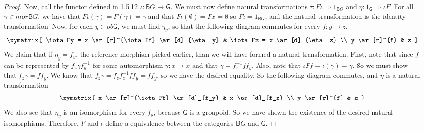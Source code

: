 \documentclass[main.tex]{subfiles}
\begin{document}
\begin{proof}
	Now, call the functor defined in 1.5.12  $\iota: \textsf{B}G \rightarrow
	\textsf{G}$. We must now define natural transformations $\tau:F\iota
	\Rightarrow 1_{\textsf{B}G} $ and $\eta: 1_{\textsf{G}}\Rightarrow \iota F$.
	For all $\gamma \in mor\textsf{B}G$, we have that $F\iota(\gamma) =
	F(\gamma) = \gamma$ and that $F\iota(\emptyset) = Fx = \emptyset$ so $F\iota
	= 1_{\textsf{B}G}$, and the natural transformation is the identity
	transformation. Now, for each $y \in ob\textsf{G}$, we must find $\eta_y$,
	so that the following diagram commutes for every $f: y \rightarrow z$.
	\[\xymatrix{
			\iota Fy = x
			\ar[r]^{\iota Ff}
			\ar[d]_{\eta_y}
			& \iota Fz = x
			\ar[d]_{\eta_z}
			\\
			y
			\ar[r]^{f}
			& z
	}\]
	We claim that if $\eta_y = f_y$, the reference morphism picked earlier, than
	we will have formed a natural transformation. First, note that since $f$ can
	be represented by $f_z\gamma f_y^{-1}$ for some automorphism $\gamma: x
	\rightarrow x$ and that $\gamma = f_z^{-1}ff_y$. Also, note that $\iota Ff =
	\iota(\gamma) = \gamma$. So we must show that $f_z\gamma = ff_y$. We know
	that $f_z\gamma = f_zf_z^{-1}ff_y = ff_y$, so we have the desired equality.
	So the following diagram commutes, and $\eta$ is a natural transformation.
	\begin{align}
		\xymatrix{
			x
			\ar[r]^{\iota Ff}
			\ar[d]_{f_y}
			&  x
			\ar[d]_{f_z}
			\\
			y
			\ar[r]^{f}
			& z
		}
	\end{align}
	We also see that $\eta_y$ is an isomorphism for every $f_y$, because
	$\textsf{G}$ is a groupoid. So we have shown the existence of the desired
	natural isomorphisms. Therefore, $F$ and $\iota$ define a equivalence
	between  the categories $\textsf{B}G$ and $\textsf{G}$.
\end{proof}
\end{document}
